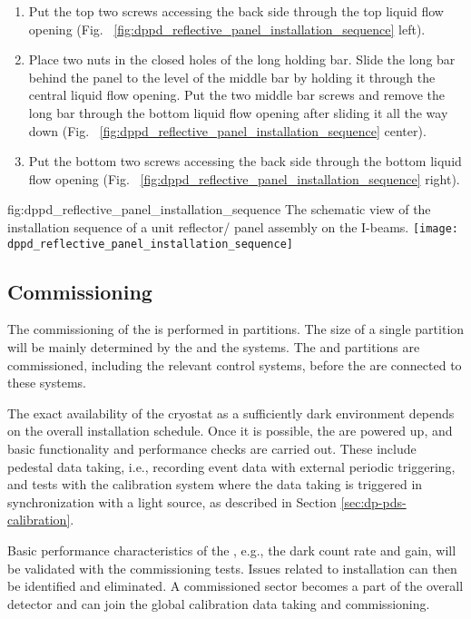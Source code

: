 \begin{enumerate}
\item Put the top two screws accessing the back side through the top liquid flow opening (Fig.~ \ref{fig:dppd_reflective_panel_installation_sequence}  left).
\item Place two nuts in the closed holes of the long holding bar. Slide the long bar behind the panel to the level of the middle bar by holding it through the central liquid flow opening. Put the two middle bar screws and remove the long bar through the bottom liquid flow opening after sliding it all the way down (Fig.~ \ref{fig:dppd_reflective_panel_installation_sequence}  center).
\item Put the bottom two screws accessing the back side through the bottom liquid flow opening (Fig.~ \ref{fig:dppd_reflective_panel_installation_sequence}  right).
\end{enumerate}

\begin{dunefigure}{fig:dppd_reflective_panel_installation_sequence}
{The schematic view of the installation sequence of a unit reflector/ panel assembly on the  I-beams.}
\texttt{[image: dppd\_reflective\_panel\_installation\_sequence]}
\end{dunefigure}

\subsection{Commissioning}
\label{subsec:dp-pds-commissioning}

The commissioning of the  is performed in partitions. The size of a single partition will be mainly determined by the  and the  systems. The  and  partitions are commissioned, including the relevant control systems, before the  are connected to these systems.

The exact availability of the cryostat as a sufficiently dark environment depends on the overall installation schedule. Once it is possible, the  are powered up, and basic functionality and performance checks are carried out. These include pedestal data taking, i.e., recording event data with external periodic triggering, and tests with the calibration system where the data taking is triggered in synchronization with a light source, as described in Section \ref{sec:dp-pds-calibration}.

Basic performance characteristics of the , e.g., the dark count rate and gain, will be validated with the commissioning tests. Issues related to installation can then be identified and eliminated. A commissioned sector becomes a part of the overall detector and can join the global calibration data taking and commissioning.


